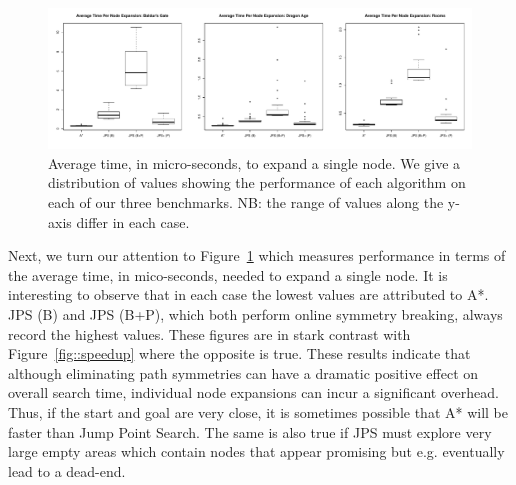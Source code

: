 \begin{figure}[tb]
       \begin{center}
		   \includegraphics[width=0.95\columnwidth, trim = 0mm 0mm 0mm 0mm]
			{diagrams/avg_time_per_node.pdf}
       \end{center}
\caption{Average time, in micro-seconds, to expand a single node. We give a distribution of values showing the performance of each algorithm
on each of our three benchmarks. NB: the range of values along the y-axis differ in each case.}
\label{fig::expansion_time}
\end{figure}

Next, we turn our attention to Figure~\ref{fig::expansion_time} which measures
performance in terms of the average time, in mico-seconds, needed to expand a single node.
It is interesting to observe that in each case the lowest values are attributed to A*. 
JPS (B) and JPS (B+P), which both perform online symmetry breaking, always record
the highest values. These figures are in stark contrast with Figure~\ref{fig::speedup} where
the opposite is true. These results indicate that although eliminating path symmetries can have
a dramatic positive effect on overall search time, individual node expansions can incur a 
significant overhead. Thus, if the start and goal are very close, it is sometimes possible that
A* will be faster than Jump Point Search. The same is also true if JPS must explore very large
empty areas which contain nodes that appear promising but e.g. eventually lead to a dead-end.

